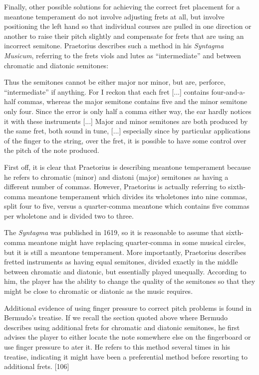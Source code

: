 Finally, other possible solutions for achieving the correct fret placement for a meantone
temperament do not involve adjusting frets at all, but involve positioning the left hand
so that individual courses are pulled in one direction or another to raise their pitch
slightly and compensate for frets that are using an incorrect semitone. Praetorius
describes such a method in his \textit{Syntagma Musicum}, referring to the frets viols and
lutes as ``intermediate'' and between chromatic and diatonic semitones:
\begin{blocks}
Thus the semitones cannot be either major nor minor, but are, perforce, ``intermediate''
if anything. For I reckon that each fret [...] contains four-and-a-half commas, whereas
the major semitone contains five and the minor semitone only four. Since the error is
only half a comma either way, the ear hardly notices it with these instruments [...]
Major and minor semitones are both produced by the same fret, both sound in tune, [...]
especially since by particular applications of the finger to the string, over the fret,
it is possible to have some control over the pitch of the note produced.
\autocite[68]{MP:1}
\end{blocks}
First off, it is clear that Praetorius is describing meantone temperament because he
refers to chromatic (minor) and diatoni (major) semitones as having a different number of
commas.  However, Praetorius is actually referring to sixth-comma meantone temperament
which divides its wholetones into nine commas, split four to five, versus a quarter-comma
meantone which contains five commas per wholetone and is divided two to three.

The \textit{Syntagma} was published in 1619, so it is reasonable to assume that
sixth-comma meantone might have replacing quarter-comma in some musical circles, but it is
still a meantone temperament.  More importantly, Praetorius describes fretted instruments
as having equal semitones, divided exactly in the middle between chromatic and diatonic,
but essentially played unequally.  According to him, the player has the ability to change
the quality of the semitones so that they might be close to chromatic or diatonic as the
music requires.

Additional evidence of using finger pressure to correct pitch problems is found in
Bermudo's treatise.  If we recall the section quoted above where Bermudo describes using
additional frets for chromatic and diatonic semitones, he first advises the player
to either locate the note somewhere else on the fingerboard or use finger pressure
to ater it.  He refers to this method several times in his treatise, indicating it
might have been a preferential method before resorting to additional frets.
\autocite{DE:1}[106]

